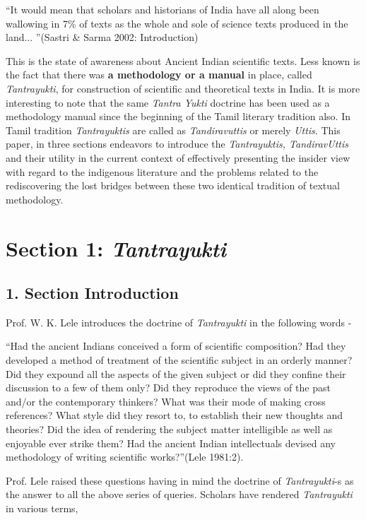 “It would mean that scholars and historians of India have all along been wallowing in 7\% of texts as the whole and sole of science texts produced in the land... ”\hfill (Sastri \& Sarma 2002: Introduction)

This is the state of awareness about Ancient Indian scientific texts. Less known is the fact that there was \textbf{a methodology or a manual} in place, called \textit{Tantrayukti}, for construction of scientific and theoretical texts in India. It is more interesting to note that the same \textit{Tantra Yukti} doctrine has been used as a methodology manual since the beginning of the Tamil literary tradition also. In Tamil tradition \textit{Tantrayuktis} are called as \textit{Tandiravuttis} or merely \textit{Uttis}. This paper, in three sections endeavors to introduce the \textit{Tantrayuktis, TandiravUttis} and their utility in the current context of effectively presenting the insider view with regard to the indigenous literature and the problems related to the rediscovering the lost bridges between these two identical tradition of textual methodology.


\section*{Section 1: \textit{Tantrayukti}}

\subsection*{1. Section Introduction }

Prof. W. K. Lele introduces the doctrine of \textit{Tantrayukti} in the following words -

“Had the ancient Indians conceived a form of scientific composition? Had they developed a method of treatment of the scientific subject in an orderly manner? Did they expound all the aspects of the given subject or did they confine their discussion to a few of them only? Did they reproduce the views of the past and/or the contemporary thinkers? What was their mode of making cross references? What style did they resort to, to establish their new thoughts and theories? Did the idea of rendering the subject matter intelligible as well as enjoyable ever strike them? Had the ancient Indian intellectuals devised any methodology of writing scientific works?”\hfill (Lele 1981:2).

Prof. Lele raised these questions having in mind the doctrine of \textit{Tantrayukti}-s as the answer to all the above series of queries. Scholars have rendered \textit{Tantrayukti} in various terms,

